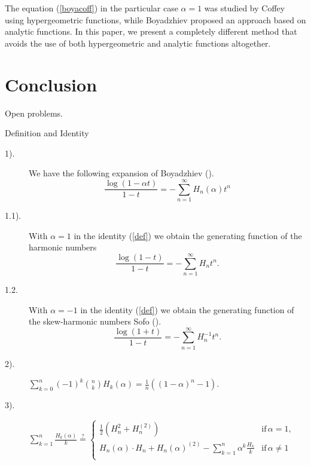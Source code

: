 \documentclass[a4paper,10pt,oneside]{article}
\newcommand{\srel}[2]{\stackrel{#1}{#2}}
\theoremstyle{definition}
\theoremstyle{remark}
\begin{document}
 The equation (\ref{boyacoff}) in the particular case $\alpha =1$ was studied by Coffey \cite{coffey} using hypergeometric functions, while Boyadzhiev \cite{khristo3} proposed an approach based on analytic functions. In this paper, we present a completely different method that avoids the use of both hypergeometric and analytic functions altogether.


  {\section{Conclusion}}
  
  \centerline{\Large Open problems.}

  

 \centerline{ Definition and Identity}
 \vspace{30pt}
  \begin{description}

 \item[1).] We have the following expansion of  Boyadzhiev (\cite{khristo3}).
  \begin{equation}
  \frac{\log(1-\alpha t)}{1-t}=-\sum_{n=1}^{\infty}H_n(\alpha)t^n \label{def}
  \end{equation}
 \item[1.1).] With $\alpha =1$ in the  identity (\ref{def}) we obtain the generating function of the harmonic numbers
 $$\frac{\log(1- t)}{1-t}=-\sum_{n=1}^{\infty}H_nt^n. $$
 \item[1.2.] 
 With $\alpha =-1$ in the  identity (\ref{def}) we obtain the generating function of the skew-harmonic numbers Sofo (\cite{sofo}).
 $$\frac{\log(1+ t)}{1-t}=-\sum_{n=1}^{\infty}H_n^{-1}t^n. $$
  \item[2).]
 $\sum_{k=0}^n(-1)^k\binom{n}{k}H_{k}(\alpha)=\frac{1}{n}\left((1-\alpha)^{n}-1\right).$
\item[3).] $\sum_{k=1}^n\frac{H_{k}(\alpha)}{k}\srel{?}{=}\begin{cases}\frac{1}{2}\left(H_n^2+H_n^{(2)}\right)&\text{if}\, \alpha=1,\\
H_n(\alpha)\cdot H_n+H_n(\alpha)^{(2)}-\sum_{k=1}^n\alpha^k\frac{H_k}{k}&\text{if}\, \alpha\ne 1\\ 
  \end{cases}$


\end{description}
\end{document}
